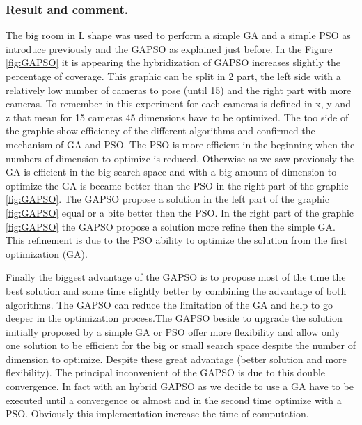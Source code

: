  \subsubsection{Result and comment.}
  

The big room in L shape was used to perform a simple GA and a simple PSO as introduce previously and the GAPSO as explained just before. In the Figure \ref{fig:GAPSO} it is appearing the hybridization of GAPSO increases slightly the percentage of coverage.%
This graphic can be split in 2 part, the left side with a relatively low number of cameras to pose (until 15) and the right part with more cameras. To remember in this experiment for each cameras is defined in x, y and z that mean for 15 cameras 45 dimensions have to be optimized.
The too side of the graphic show efficiency  of the different algorithms and confirmed  the mechanism of GA and PSO.
The PSO is more efficient in the beginning when the numbers of dimension to optimize is reduced. Otherwise as we saw previously the GA is efficient in the big search space and with a big amount of dimension to optimize the GA is became better than the PSO in the right part of the graphic \ref{fig:GAPSO}. 
The GAPSO propose a solution in the left part of the graphic \ref{fig:GAPSO} equal or a bite better then the PSO. In the right part of the graphic \ref{fig:GAPSO} the GAPSO propose a solution more refine then the simple GA. This refinement is due to the PSO ability to optimize the solution from the first optimization (GA). 

Finally the biggest advantage of the GAPSO is to propose most of the time the best solution and some time slightly better by combining the advantage of both algorithms. 
The GAPSO can reduce the limitation of the GA and help to go deeper in the optimization process.The GAPSO  beside to upgrade the solution initially proposed by a simple GA or PSO offer more flexibility and allow only one solution to be efficient for the big or small search space despite the number of dimension to optimize.
Despite these great advantage (better solution and more flexibility).
The principal inconvenient of the GAPSO is due to this double convergence. In fact with an hybrid GAPSO as we decide to use a GA have to be executed until a convergence or almost and in the second time optimize with a PSO. Obviously this implementation increase the time of computation.
 
